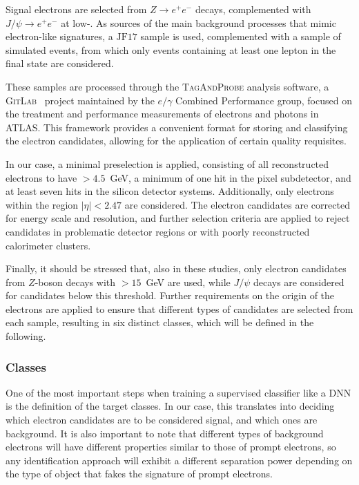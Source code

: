 Signal electrons are selected from $Z \rightarrow e^{+}e^{-}$ decays, complemented with $J/\psi \rightarrow e^{+}e^{-}$ at low-\et. As sources of the main background processes that mimic electron-like signatures, a $\text{JF}17$ sample is used, complemented with a sample of simulated \ttbar events, from which only events containing at least one lepton in the final state are considered.

These samples are processed through the \textsc{TagAndProbe} analysis software, a \textsc{GitLab}~\cite{tagandprobe} project maintained by the $e/\gamma$ Combined Performance group, focused on the treatment and performance measurements of electrons and photons in ATLAS. This framework provides a convenient format for storing and classifying the electron candidates, allowing for the application of certain quality requisites.

In our case, a minimal preselection is applied, consisting of all reconstructed electrons to have \et$>4.5$~GeV, a minimum of one hit in the pixel subdetector, and at least seven hits in the silicon detector systems. Additionally, only electrons within the region $|\eta| < 2.47$ are considered. The electron candidates are corrected for energy scale and resolution, and further selection criteria are applied to reject candidates in problematic detector regions or with poorly reconstructed calorimeter clusters.

Finally, it should be stressed that, also in these studies, only electron candidates from $Z$-boson decays with \et $>15$~GeV are used, while $J/\psi$ decays are considered for candidates below this threshold. Further requirements on the origin of the electrons are applied to ensure that different types of candidates are selected from each sample, resulting in six distinct classes, which will be defined in the following.

\subsubsection{Classes}

One of the most important steps when training a supervised classifier like a DNN is the definition of the target classes. In our case, this translates into deciding which electron candidates are to be considered signal, and which ones are background. It is also important to note that different types of background electrons will have different properties similar to those of prompt electrons,
so any identification approach will exhibit a different separation power depending on the type of object that fakes the signature of prompt electrons.

